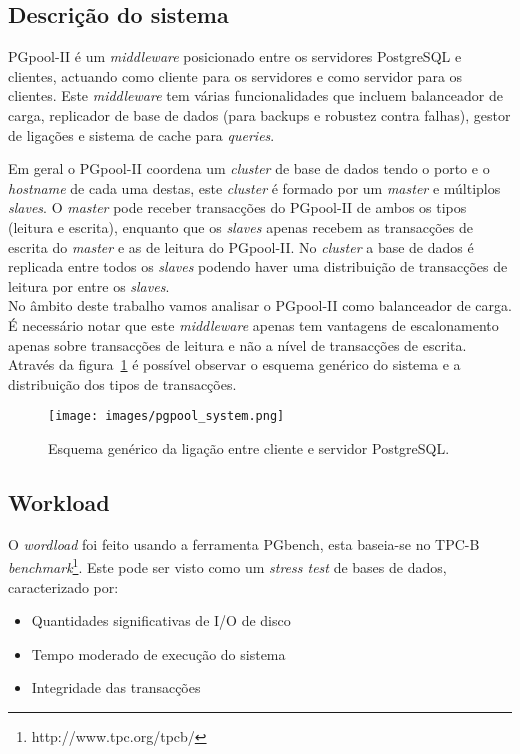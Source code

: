 \subsection{Descrição do sistema}
PGpool-II é um \textit{middleware} posicionado entre os servidores PostgreSQL e clientes, actuando como cliente para os servidores e como servidor para os clientes. Este \textit{middleware} tem várias funcionalidades que incluem balanceador de carga, replicador de base de dados (para backups e robustez contra falhas), gestor de ligações e sistema de cache para \textit{queries}. 

Em geral o PGpool-II coordena um \textit{cluster} de base de dados tendo o porto e o \textit{hostname} de cada uma destas, este \textit{cluster} é formado por um \textit{master} e múltiplos \textit{slaves}. O \textit{master} pode receber transacções do PGpool-II de ambos os tipos (leitura e escrita), enquanto que os \textit{slaves} apenas recebem as transacções de escrita do \textit{master} e as de leitura do PGpool-II.
No \textit{cluster} a base de dados é replicada entre todos os \textit{slaves} podendo haver uma distribuição de transacções de leitura por entre os \textit{slaves}. \\

No âmbito deste trabalho vamos analisar o PGpool-II como balanceador de carga. É necessário notar que este \textit{middleware} apenas tem vantagens de escalonamento apenas sobre transacções de leitura e não a nível de transacções de escrita. Através da figura~\ref{fig:esquema} é possível observar o esquema genérico do sistema e a distribuição dos tipos de transacções.

\begin{figure}
    \centering
    \texttt{[image: images/pgpool\_system.png]}
    \caption{Esquema genérico da ligação entre cliente e servidor PostgreSQL.}
    \label{fig:esquema}
\end{figure}

\subsection{Workload}

O \textit{wordload} foi feito usando a ferramenta PGbench, esta baseia-se no TPC-B \textit{benchmark}\footnote{http://www.tpc.org/tpcb/}. Este pode ser visto como um \textit{stress test} de bases de dados, caracterizado por:

\begin{itemize}
    \item Quantidades significativas de I/O de disco
    \item Tempo moderado de execução do sistema
    \item Integridade das transacções
\end{itemize}

